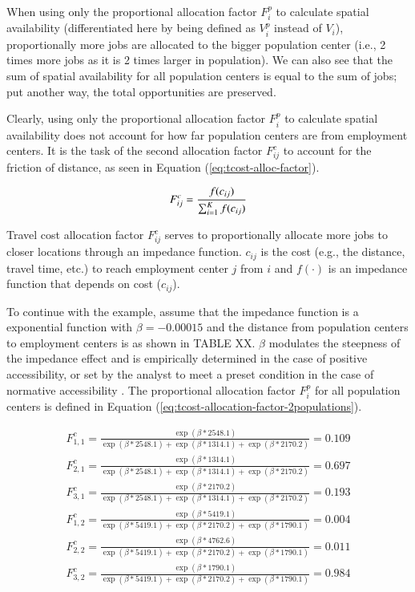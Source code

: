 \documentclass[]{elsarticle} %
\begin{document}
When using only the proportional allocation factor \(F^p_{i}\) to
calculate spatial availability (differentiated here by being defined as
\(V^p_{i}\) instead of \(V_{i}\)), proportionally more jobs are
allocated to the bigger population center (i.e., 2 times more jobs as it
is 2 times larger in population). We can also see that the sum of
spatial availability for all population centers is equal to the sum of
jobs; put another way, the total opportunities are preserved.

Clearly, using only the proportional allocation factor \(F^p_{i}\) to
calculate spatial availability does not account for how far population
centers are from employment centers. It is the task of the second
allocation factor \(F^c_{ij}\) to account for the friction of distance,
as seen in Equation (\ref{eq:tcost-alloc-factor}).

\begin{equation}
\label{eq:tcost-alloc-factor}
F^c_{ij} = \frac{f(c_{ij})}{\sum_{i=1}^K f(c_{ij})}\\
\end{equation}

Travel cost allocation factor \(F^c_{ij}\) serves to proportionally
allocate more jobs to closer locations through an impedance function.
\(c_{ij}\) is the cost (e.g., the distance, travel time, etc.) to reach
employment center \(j\) from \(i\) and \(f(\cdot)\) is an impedance
function that depends on cost (\(c_{ij}\)).

To continue with the example, assume that the impedance function is a
exponential function with \(\beta=-0.00015\) and the distance from
population centers to employment centers is as shown in TABLE XX.
\(\beta\) modulates the steepness of the impedance effect and is
empirically determined in the case of positive accessibility, or set by
the analyst to meet a preset condition in the case of normative
accessibility \citep{paez2012measuring}. The proportional allocation
factor \(F^p_{i}\) for all population centers is defined in Equation
(\ref{eq:tcost-allocation-factor-2populations}).

\begin{equation}
\label{eq:tcost-allocation-factor-2populations}
\begin{array}{l}
F^c_{1,1} = \frac{\exp(\beta*2548.1)}{\exp(\beta *2548.1) + \exp(\beta *1314.1) + \exp(\beta *2170.2)} = 0.109\\
F^c_{2,1} = \frac{\exp(\beta *1314.1)}{\exp(\beta *2548.1) + \exp(\beta *1314.1) + \exp(\beta *2170.2)} = 0.697\\
F^c_{3,1} = \frac{\exp(\beta *2170.2)}{\exp(\beta *2548.1) + \exp(\beta *1314.1) + \exp(\beta *2170.2)} = 0.193\\
F^c_{1,2} = \frac{\exp(\beta*5419.1)}{\exp(\beta *5419.1) + \exp(\beta *2170.2) + \exp(\beta *1790.1)} = 0.004\\
F^c_{2,2} = \frac{\exp(\beta *4762.6)}{\exp(\beta *5419.1) + \exp(\beta *2170.2) + \exp(\beta *1790.1)} = 0.011\\
F^c_{3,2} = \frac{\exp(\beta *1790.1)}{\exp(\beta *5419.1) + \exp(\beta *2170.2) + \exp(\beta *1790.1)} = 0.984\\
\end{array}
\end{equation}
\end{document}

